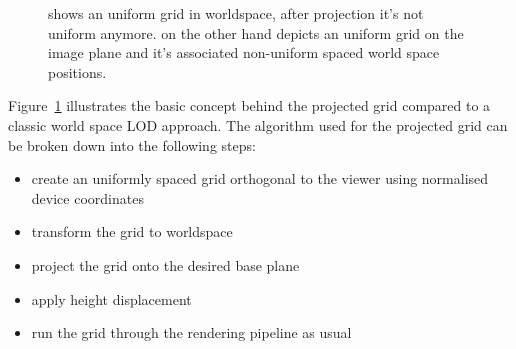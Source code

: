 \begin{figure}
\centering
{}
\caption[The Projected Grid Concept]{ shows an
uniform grid in worldspace, after projection it's not uniform anymore.
 on the other hand depicts an uniform grid on the
image plane and it's associated non-uniform spaced world space positions.}
\label{fig:projectedgrid}
\end{figure}
Figure~\ref{fig:projectedgrid} illustrates the basic concept behind the
projected grid compared to a classic world space LOD approach. The algorithm
used for the projected grid can be broken down into the following steps:
\begin{itemize}
 \item create an uniformly spaced grid orthogonal to the viewer using normalised
device coordinates
 \item transform the grid to worldspace
 \item project the grid onto the desired base plane
 \item apply height displacement
 \item run the grid through the rendering pipeline as usual
\end{itemize}

